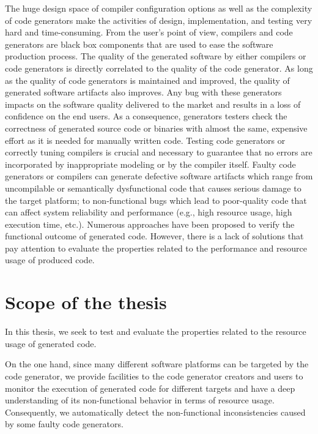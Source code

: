  


The huge design space of compiler configuration options as well as the complexity of code generators make the activities of design, implementation, and testing very hard and time-consuming\cite{guana2015developers}.
From the user's point of view, compilers and code generators are black box components that are used to ease the software production process. The quality of the generated software by either compilers or code generators is directly correlated to the quality of the code generator. As long as the quality of code generators is maintained and improved, the quality of generated software artifacts also improves. Any bug with these generators impacts on the software quality delivered to the market and results in a loss of confidence on the end users.
As a consequence, generators testers check the correctness of generated source code or binaries with almost the same, expensive effort as it is needed for manually written code. 
Testing code generators or correctly tuning compilers is crucial and necessary to guarantee that no errors are incorporated by inappropriate modeling or by the compiler itself.
Faulty code generators or compilers can generate defective software artifacts which range from uncompilable or semantically dysfunctional code that causes serious damage to the target platform; to non-functional bugs which lead to poor-quality code that can affect system reliability and performance (e.g., high resource usage, high execution time, etc.). 
Numerous approaches have been proposed\cite{stuermer2007systematic,yang2011finding} to verify the functional outcome of generated code. However, there is a lack of solutions that pay attention to evaluate the properties related to the performance and resource usage of produced code.


\section{Scope of the thesis}

In this thesis, we seek to test and evaluate the properties related to the resource usage of generated code. 

On the one hand, since many different software platforms can be targeted by the code generator, we provide facilities to the code generator creators and users to monitor the execution of generated code for different targets and have a deep understanding of its non-functional behavior in terms of resource usage. Consequently, we automatically detect the non-functional inconsistencies caused by some faulty code generators. 

